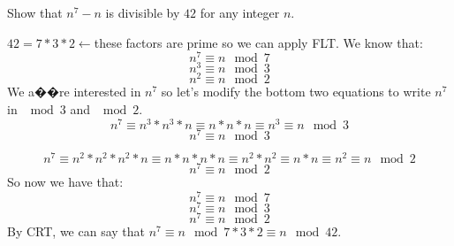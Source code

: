 \question Show that $n^7 - n$ is divisible by $42$ for any integer $n$.
\begin{solution}[1.75 in]
$42 = 7 * 3 * 2 \leftarrow$these factors are prime so we can apply FLT. We know that: \newline
\[n^7 \equiv n \mod 7\]
\[n^3 \equiv n \mod 3\]
\[n^2 \equiv n \mod 2\]
We a��re interested in $n^7$ so let's modify the bottom two equations to 
write $n^7$ in $\mod 3$ and $\mod 2$. \newline
\[n^7 \equiv n^3 * n^3 * n \equiv n * n * n \equiv n^3 \equiv n \mod 3\]
\[n^7 \equiv n \mod 3\]

\[n^7 \equiv n^2 * n^2 * n^2 * n \equiv n * n * n * n \equiv n^2 * n^2 
\equiv n * n \equiv n^2 \equiv n \mod 2\]
\[n^7 \equiv n \mod 2\]
So now we have that: \newline
\[n^7 \equiv n \mod 7\]
\[n^7 \equiv n \mod 3\]
\[n^7 \equiv n \mod 2\]
By CRT, we can say that $n^{7} \equiv n \mod 7*3*2 \equiv n \mod 42$.
\end{solution}